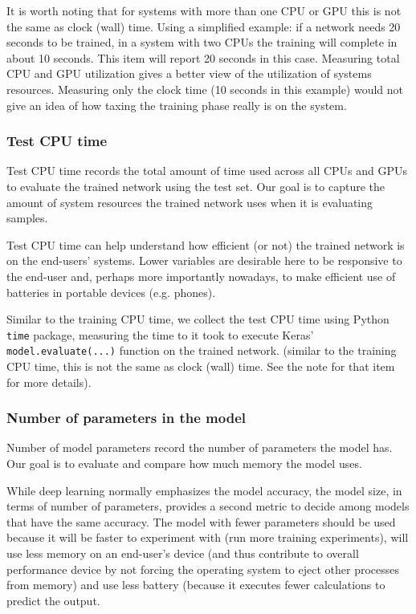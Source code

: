 \documentclass[../dropout-vs-batch-normalization.tex]{subfiles}
\begin{document}
It is worth noting that for systems with more than one CPU or GPU this is not the same as clock (wall) time. Using a simplified example: if a network needs 20 seconds to be trained, in a system with two CPUs the training will complete in about 10 seconds. This item will report 20 seconds in this case. Measuring total CPU and GPU utilization gives a better view of the utilization of systems resources. Measuring only the clock time (10 seconds in this example) would not give an idea of how taxing the training phase really is on the system.

\medskip
\subsubsection{Test CPU time}

Test CPU time records the total amount of time used across all CPUs and GPUs to evaluate the trained network using the test set. Our goal is to capture the amount of system resources the trained network uses when it is evaluating samples. 

Test CPU time can help understand how efficient (or not) the trained network is on the end-users' systems. Lower variables are desirable here to be responsive to the end-user and, perhaps more importantly nowadays, to make efficient use of batteries in portable devices (e.g. phones).

Similar to the training CPU time, we collect the test CPU time using Python \verb|time| package, measuring the time to it took to execute Keras' \verb|model.evaluate(...)| function on the trained network. (similar to the training CPU time, this is not the same as clock (wall) time. See the note for that item for more details).

\medskip
\subsubsection{Number of parameters in the model}

Number of model parameters record the number of parameters the model has. Our goal is to evaluate and compare how much memory the model uses.

While deep learning normally emphasizes the model accuracy, the model size, in terms of number of parameters, provides a second metric to decide among models that have the same accuracy. The model with fewer parameters should be used because it will be faster to experiment with (run more training experiments), will use less memory on an end-user's device (and thus contribute to overall performance device by not forcing the operating system to eject other processes from memory) and use less battery (because it executes fewer calculations to predict the output.
\end{document}
